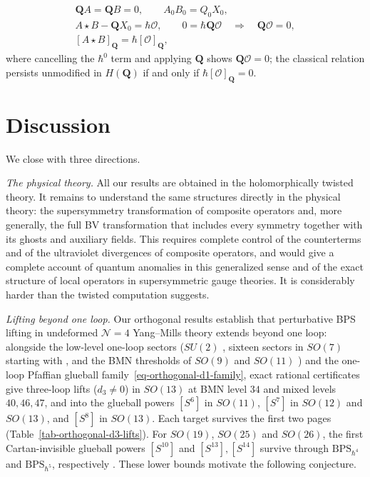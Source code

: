 \documentclass[11pt]{article}
\numberwithin{equation}{section}
\numberwithin{figure}{section}
\numberwithin{table}{section}
\begin{document}
\begin{equation}\label{eq-product-classical-relation}
\begin{gathered}
\mathbf QA=\mathbf QB=0,\qquad A_0B_0=Q_0X_0,\\
A\star B-\mathbf QX_0=\hbar\mathcal O,\qquad
0=\hbar\mathbf Q\mathcal O\quad\Longrightarrow\quad\mathbf Q\mathcal O=0,\\
[A\star B]_{\mathbf Q}=\hbar[\mathcal O]_{\mathbf Q},
\end{gathered}
\end{equation}
where cancelling the $\hbar^0$ term and applying $\mathbf Q$ shows $\mathbf Q\mathcal O=0$; the classical relation persists unmodified in $H(\mathbf Q)$ if and only if $\hbar[\mathcal O]_{\mathbf Q}=0$.

\section{Discussion}\label{sec-conclusion}

We close with three directions.

\emph{The physical theory.} All our results are obtained in the holomorphically twisted theory. It remains to understand the same structures directly in the physical theory: the supersymmetry transformation of composite operators and, more generally, the full BV transformation that includes every symmetry together with its ghosts and auxiliary fields. This requires complete control of the counterterms and of the ultraviolet divergences of composite operators, and would give a complete account of quantum anomalies in this generalized sense and of the exact structure of local operators in supersymmetric gauge theories. It is considerably harder than the twisted computation suggests.

\emph{Lifting beyond one loop.} Our orthogonal results establish that perturbative BPS lifting in undeformed $\mathcal N=4$ Yang--Mills theory extends beyond one loop: alongside the low-level one-loop sectors ($SU(2)$ \cite{KKLP}, sixteen sectors in $SO(7)$ starting with \cite{KonishiBH}, and the BMN thresholds of $SO(9)$ and $SO(11)$ \cite[Section 6.6]{FortuityAI}) and the one-loop Pfaffian glueball family~\eqref{eq-orthogonal-d1-family}, exact rational certificates give three-loop lifts ($d_3\ne0$) in $SO(13)$ at BMN level $34$ and mixed levels $40,46,47$, and into the glueball powers $[S^6]$ in $SO(11)$, $[S^7]$ in $SO(12)$ and $SO(13)$, and $[S^8]$ in $SO(13)$. Each target survives the first two pages (Table~\ref{tab-orthogonal-d3-lifts}). For $SO(19)$, $SO(25)$ and $SO(26)$, the first Cartan-invisible glueball powers $[S^{10}]$ and $[S^{13}],[S^{14}]$ survive through $\mathrm{BPS}_{\hbar^4}$ and $\mathrm{BPS}_{\hbar^5}$, respectively \cite{Repo}. These lower bounds motivate the following conjecture.
\end{document}
